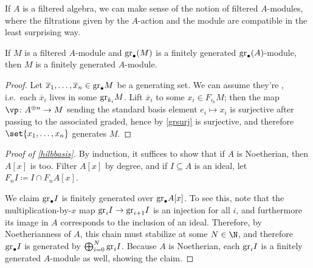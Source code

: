 If $A$ is a filtered algebra, we can make sense of the notion of filtered $A$-modules, where the filtrations given
by the $A$-action and the module are compatible in the least surprising way.
\begin{lem}
If $M$ is a filtered $A$-module and $\mathrm{gr}_\bullet(M)$ is a finitely generated $\mathrm{gr}_\bullet(A)$-module, then $M$ is a
finitely generated $A$-module.
\end{lem}
\begin{proof}
Let $\overline x_1,\dotsc,\overline x_n\in\mathrm{gr}_\bullet M$ be a generating set. We can assume they're
, i.e.\ each $\overline x_i$ lives in some $\mathrm{gr}_{k_i}M$. Lift $\overline x_i$ to some $x_i\in
F_{i_k}M$; then the map $\vp\colon A^{\oplus n}\to M$ sending the standard basis element $e_i\mapsto x_i$ is
surjective after passing to the associated graded, hence by \cref{grsurj} is surjective, and therefore
$\set{x_1,\dotsc,x_n}$ generates $M$.
\end{proof}
\begin{proof}[Proof of \cref{hilbbasis}]
By induction, it suffices to show that if $A$ is Noetherian, then $A[x]$ is too. Filter $A[x]$ by degree, and if
$I\subseteq A$ is an ideal, let $F_nI\coloneqq I\cap F_nA[x]$.

We claim $\mathrm{gr}_\bullet I$ is finitely generated over $\mathrm{gr}_\bullet A[x]$. To see this, note that the
multiplication-by-$x$ map $\mathrm{gr}_i I \to\mathrm{gr}_{i + 1}I$ is an injection for all $i$, and furthermore its image in $A$
corresponds to the inclusion of an ideal. Therefore, by Noetherianness of $A$, this chain must stabilize at some $N
\in \N$, and therefore $\mathrm{gr}_\bullet I$ is generated by $\bigoplus_{i = 0}^N \mathrm{gr}_iI$. Because $A$ is Noetherian,
each $\mathrm{gr}_iI$ is a finitely generated $A$-module as well, showing the claim.  
\end{proof}
